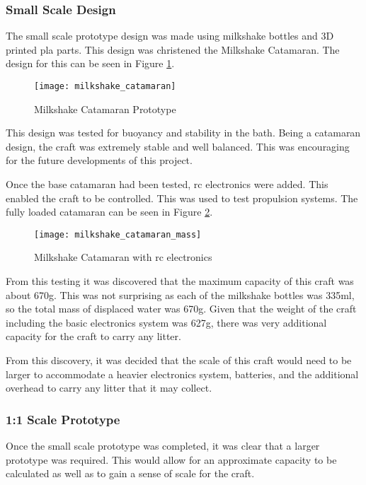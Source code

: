 \documentclass [12pt]{article}
\begin{document}
\subsubsection{Small Scale Design}

The small scale prototype design was made using milkshake bottles and 3D printed \gls{pla} parts. This design was christened the Milkshake Catamaran. The design for this can be seen in Figure \ref{fig:milkshake_catamaran}.

\begin{figure}[H]
\centerline{\texttt{[image: milkshake\_catamaran]}}
\caption{Milkshake Catamaran Prototype}
\label{fig:milkshake_catamaran}
\end{figure}

This design was tested for buoyancy and stability in the bath. Being a \gls{catamaran} design, the craft was extremely stable and well balanced. This was encouraging for the future developments of this project. 

Once the base catamaran had been tested, \gls{rc} electronics were added. This enabled the craft to be controlled. This was used to test propulsion systems. The fully loaded \gls{catamaran} can be seen in Figure \ref{fig:milkshake_catamaran_mass}.   

\begin{figure}[H]
\centerline{\texttt{[image: milkshake\_catamaran\_mass]}}
\caption{Milkshake Catamaran with \gls{rc} electronics}
\label{fig:milkshake_catamaran_mass}
\end{figure}

From this testing it was discovered that the maximum capacity of this craft was about 670g. This was not surprising as each of the milkshake bottles was 335ml, so the total mass of displaced water was 670g. Given that the weight of the craft including the basic electronics system was 627g, there was very additional capacity for the craft to carry any litter.

From this discovery, it was decided that the scale of this craft would need to be larger to accommodate a heavier electronics system, batteries, and the additional overhead to carry any litter that it may collect. 

\subsubsection{1:1 Scale Prototype}

Once the small scale prototype was completed, it was clear that a larger prototype was required. This would allow for an approximate capacity to be calculated as well as to gain a sense of scale for the craft. 
\end{document}
